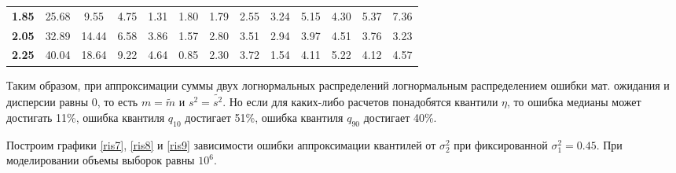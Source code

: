 \documentclass[12pt]{article}
\begin{document}
\begin{table}[!hhh]
\begin{tabular}{|c|ccclcccccccc}
			\textbf{1.85}                       & 25.68                              & 9.55                               & 4.75                               & 1.31                               & 1.80                               & 1.79                               & 2.55                               & 3.24                               & 5.15                               & 4.30                               & 5.37                               & 7.36                               \\ \cline{1-1}
			\textbf{2.05}                       & 32.89                              & 14.44                              & 6.58                               & 3.86                               & 1.57                               & 2.80                               & 3.51                               & 2.94                               & 3.97                               & 4.51                               & 3.76                               & 3.23                               \\ \cline{1-1}
			\multicolumn{1}{|l|}{\textbf{2.25}} & \multicolumn{1}{l}{40.04}          & \multicolumn{1}{l}{18.64}          & \multicolumn{1}{l}{9.22}           & 4.64                               & \multicolumn{1}{l}{0.85}           & \multicolumn{1}{l}{2.30}           & \multicolumn{1}{l}{3.72}           & \multicolumn{1}{l}{1.54}           & \multicolumn{1}{l}{4.11}           & \multicolumn{1}{l}{5.22}           & \multicolumn{1}{l}{4.12}           & \multicolumn{1}{l}{4.57}           \\ \cline{1-1}
		\end{tabular}
	\end{table}
	
	Таким образом, при аппроксимации суммы двух логнормальных распределений логнормальным распределением ошибки мат. ожидания и дисперсии равны 0, то есть $m=\tilde{m}$ и $s^{2} = \tilde{s^{2}}$. Но если для каких-либо расчетов понадобятся квантили $\eta$, то ошибка медианы может достигать 11\%, ошибка  квантиля $q_{10}$ достигает 51\%, ошибка квантиля $q_{90}$ достигает 40\%.
	
	Построим графики \ref{ris7}, \ref{ris8} и \ref{ris9} зависимости ошибки аппроксимации квантилей от $\sigma_{2}^{2}$ при фиксированной $\sigma_{1}^{2} = 0.45$. При моделировании объемы выборок равны $10^{6}$.
	
\end{document}
